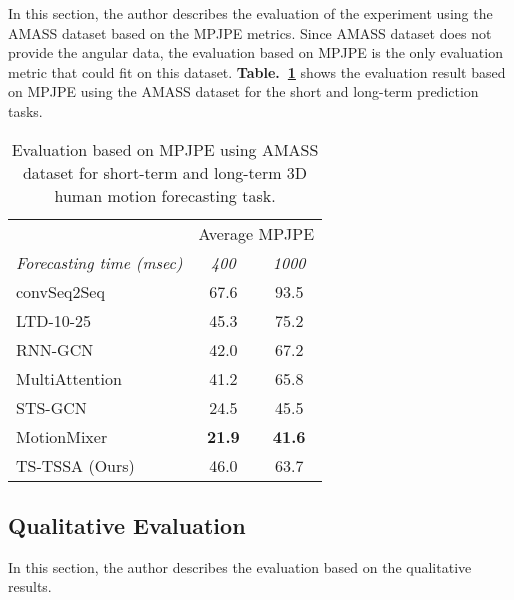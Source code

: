 In this section, the author describes the evaluation of the experiment using the AMASS dataset based on the MPJPE metrics.
Since AMASS dataset does not provide the angular data, the evaluation based on MPJPE is the only evaluation metric that could fit on this dataset. \textbf{Table.~\ref{tbl:3D_AMASS}} shows the evaluation result based on MPJPE using the AMASS dataset for the short and long-term prediction tasks. 
\begin{table}
    \centering
    \caption{Evaluation based on MPJPE using AMASS dataset for short-term and long-term 3D human motion forecasting task.}
        \begin{tabular}{|l|cc|}
        \toprule
             & \multicolumn{2}{c|}{Average MPJPE} \\
             
           \textit{Forecasting time (msec)}  & \textit{400} & \textit{1000} \\
        \midrule
            convSeq2Seq~\cite{Li_2018} & 67.6 & 93.5 \\
            LTD-10-25~\cite{Mao2019} & 45.3 & 75.2 \\
            RNN-GCN~\cite{Mao2020} & 42.0 & 67.2 \\
            MultiAttention~\cite{mao2021multi} & 41.2 & 65.8 \\
            STS-GCN~\cite{Sofianos2021}  & 24.5 & 45.5 \\
            MotionMixer~\cite{motionmixer2022}  & \textbf{21.9} & \textbf{41.6}\\
            TS-TSSA (Ours) & 46.0 & 63.7 \\
        \midrule
    
        \end{tabular} 
    \label{tbl:3D_AMASS}
\end{table}


\subsection{Qualitative Evaluation}\label{4:qual_evaluation}
In this section, the author describes the evaluation based on the qualitative results.

